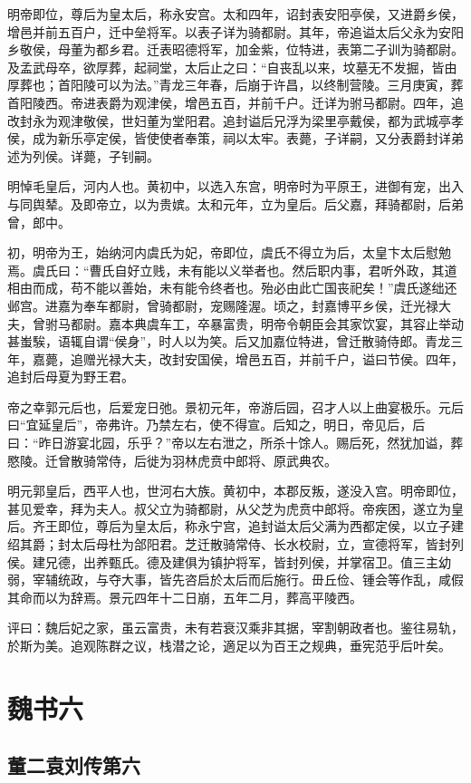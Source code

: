 \documentclass[12pt,UTF8]{ctexbook}
\begin{document}
明帝即位，尊后为皇太后，称永安宫。太和四年，诏封表安阳亭侯，又进爵乡侯，增邑并前五百户，迁中垒将军。以表子详为骑都尉。其年，帝追谥太后父永为安阳乡敬侯，母董为都乡君。迁表昭德将军，加金紫，位特进，表第二子训为骑都尉。及孟武母卒，欲厚葬，起祠堂，太后止之曰：“自丧乱以来，坟墓无不发掘，皆由厚葬也；首阳陵可以为法。”青龙三年春，后崩于许昌，以终制营陵。三月庚寅，葬首阳陵西。帝进表爵为观津侯，增邑五百，并前千户。迁详为驸马都尉。四年，追改封永为观津敬侯，世妇董为堂阳君。追封谥后兄浮为梁里亭戴侯，都为武城亭孝侯，成为新乐亭定侯，皆使使者奉策，祠以太牢。表薨，子详嗣，又分表爵封详弟述为列侯。详薨，子钊嗣。

明悼毛皇后，河内人也。黄初中，以选入东宫，明帝时为平原王，进御有宠，出入与同舆辇。及即帝立，以为贵嫔。太和元年，立为皇后。后父嘉，拜骑都尉，后弟曾，郎中。

初，明帝为王，始纳河内虞氏为妃，帝即位，虞氏不得立为后，太皇卞太后慰勉焉。虞氏曰：“曹氏自好立贱，未有能以义举者也。然后职内事，君听外政，其道相由而成，苟不能以善始，未有能令终者也。殆必由此亡国丧祀矣！”虞氏遂绌还邺宫。进嘉为奉车都尉，曾骑都尉，宠赐隆渥。顷之，封嘉博平乡侯，迁光禄大夫，曾驸马都尉。嘉本典虞车工，卒暴富贵，明帝令朝臣会其家饮宴，其容止举动甚蚩騃，语辄自谓“侯身”，时人以为笑。后又加嘉位特进，曾迁散骑侍郎。青龙三年，嘉薨，追赠光禄大夫，改封安国侯，增邑五百，并前千户，谥曰节侯。四年，追封后母夏为野王君。

帝之幸郭元后也，后爱宠日弛。景初元年，帝游后园，召才人以上曲宴极乐。元后曰“宜延皇后”，帝弗许。乃禁左右，使不得宣。后知之，明日，帝见后，后曰：“昨日游宴北园，乐乎？”帝以左右泄之，所杀十馀人。赐后死，然犹加谥，葬愍陵。迁曾散骑常侍，后徙为羽林虎贲中郎将、原武典农。

明元郭皇后，西平人也，世河右大族。黄初中，本郡反叛，遂没入宫。明帝即位，甚见爱幸，拜为夫人。叔父立为骑都尉，从父芝为虎贲中郎将。帝疾困，遂立为皇后。齐王即位，尊后为皇太后，称永宁宫，追封谥太后父满为西都定侯，以立子建绍其爵；封太后母杜为郃阳君。芝迁散骑常侍、长水校尉，立，宣德将军，皆封列侯。建兄德，出养甄氏。德及建俱为镇护将军，皆封列侯，并掌宿卫。值三主幼弱，宰辅统政，与夺大事，皆先咨启於太后而后施行。毌丘俭、锺会等作乱，咸假其命而以为辞焉。景元四年十二日崩，五年二月，葬高平陵西。

评曰：魏后妃之家，虽云富贵，未有若衰汉乘非其据，宰割朝政者也。鉴往易轨，於斯为美。追观陈群之议，栈潜之论，適足以为百王之规典，垂宪范乎后叶矣。

\part{魏书六}
\chapter{董二袁刘传第六}
\end{document}
